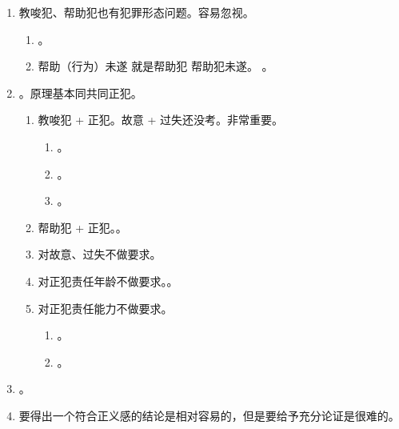 \begin{enumerate}
\begin{enumerate}
\begin{enumerate}
                  \item 主观上是否明知对方在犯罪。。
                \end{enumerate}
        \end{enumerate}
  \item 教唆犯、帮助犯也有犯罪形态问题。容易忽视。
        \begin{enumerate}
          \item {}。
          \item 帮助（行为）未遂 \bdy 就是帮助犯 \bdy 帮助犯未遂。
                。
        \end{enumerate}
  \item {}。原理基本同共同正犯。
        \begin{enumerate}
          \item 教唆犯 + 正犯。故意 + 过失还没考。非常重要。
                \begin{enumerate}
                  \item {}。
                  \item {}。
                  \item {}。
                \end{enumerate}
          \item 帮助犯 + 正犯。。
          \item 对故意、过失不做要求。
          \item 对正犯责任年龄不做要求。。
          \item 对正犯责任能力不做要求。
                \begin{enumerate}
                  \item {}。
                  \item {}。
                \end{enumerate}
        \end{enumerate}
  \item {}。
  \item 要得出一个符合正义感的结论是相对容易的，但是要给予充分论证是很难的。
\end{enumerate}

